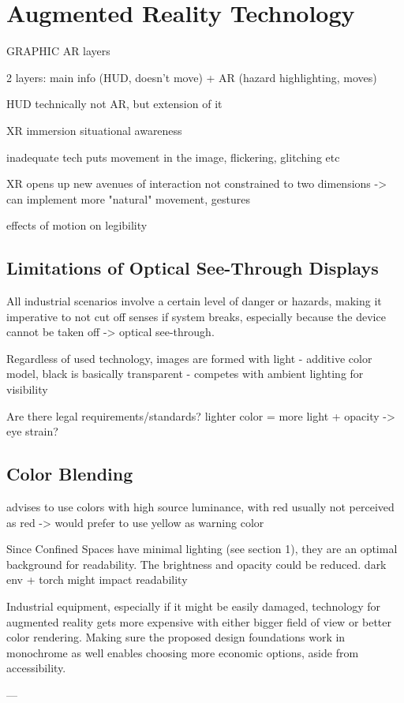 \section{Augmented Reality Technology}

GRAPHIC AR layers

2 layers: main info (HUD, doesn't move) + AR (hazard highlighting, moves)

HUD technically not AR, but extension of it

XR immersion situational awareness

inadequate tech puts movement in the image, flickering, glitching etc

XR opens up new avenues of interaction
not constrained to two dimensions -> can implement more "natural" movement, gestures

effects of motion on legibility

\subsection{Limitations of Optical See-Through Displays}

All industrial scenarios involve a certain level of danger or hazards, making it imperative to not cut off senses if system breaks, especially because the device cannot be taken off -> optical see-through. 

Regardless of used technology, images are formed with light
- additive color model, black is basically transparent \cite{kimEffectsDarkMode2019}
- competes with ambient lighting for visibility

Are there legal requirements/standards?
lighter color = more light + opacity -> eye strain?

\subsection{Color Blending}

\cite{gabbardPerceptualColorMatchingMethod2022} advises to use colors with high source luminance, with red usually not perceived as red -> would prefer to use yellow as warning color

Since Confined Spaces have minimal lighting (see section 1), they are an optimal background for readability. The brightness and opacity could be reduced. dark env + torch might impact readability

Industrial equipment, especially if it might be easily damaged, 
technology for augmented reality gets more expensive with either bigger field of view or better color rendering.
Making sure the proposed design foundations work in monochrome as well enables choosing more economic options, aside from accessibility.

---

\cite{itohIndistinguishableAugmentedReality2021}